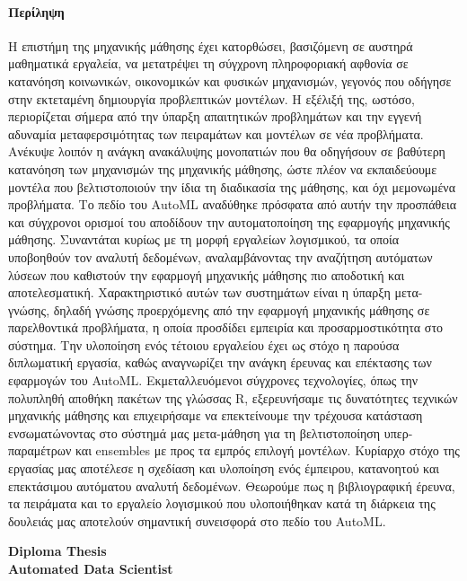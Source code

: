 {
	\titleformat{\paragraph}[display]{\normalfont\Large\bfseries\centering}{\theparagraph}{1em}{}
	\paragraph{Περίληψη}
	Η επιστήμη της μηχανικής μάθησης έχει κατορθώσει, βασιζόμενη σε αυστηρά μαθηματικά εργαλεία, να μετατρέψει τη σύγχρονη πληροφοριακή αφθονία σε κατανόηση κοινωνικών, οικονομικών και φυσικών μηχανισμών, γεγονός που οδήγησε στην εκτεταμένη δημιουργία προβλεπτικών μοντέλων. Η εξέλιξή της, ωστόσο, περιορίζεται σήμερα από την ύπαρξη απαιτητικών προβλημάτων και την εγγενή αδυναμία μεταφερσιμότητας των πειραμάτων και μοντέλων σε νέα προβλήματα. Ανέκυψε λοιπόν η ανάγκη ανακάλυψης μονοπατιών που θα οδηγήσουν σε βαθύτερη κατανόηση των μηχανισμών της μηχανικής μάθησης, ώστε πλέον να εκπαιδεύουμε μοντέλα που βελτιστοποιούν την ίδια τη διαδικασία της μάθησης, και όχι μεμονωμένα προβλήματα. Το πεδίο του ΑutoML αναδύθηκε πρόσφατα από αυτήν την προσπάθεια και σύγχρονοι ορισμοί του αποδίδουν την αυτοματοποίηση της εφαρμογής μηχανικής μάθησης. Συναντάται κυρίως με τη μορφή εργαλείων λογισμικού, τα οποία υποβοηθούν τον αναλυτή δεδομένων, αναλαμβάνοντας την αναζήτηση αυτόματων λύσεων που καθιστούν την εφαρμογή μηχανικής μάθησης πιο αποδοτική και αποτελεσματική. Χαρακτηριστικό αυτών των συστημάτων είναι η ύπαρξη μετα-γνώσης, δηλαδή γνώσης προερχόμενης από την εφαρμογή μηχανικής μάθησης σε παρελθοντικά προβλήματα, η οποία προσδίδει εμπειρία και προσαρμοστικότητα στο σύστημα. Την υλοποίηση ενός τέτοιου εργαλείου έχει ως στόχο η παρούσα διπλωματική εργασία, καθώς αναγνωρίζει την ανάγκη έρευνας και επέκτασης των εφαρμογών του \gls{AutoML}. Εκμεταλλευόμενοι σύγχρονες τεχνολογίες, όπως την πολυπληθή αποθήκη πακέτων της γλώσσας R, εξερευνήσαμε τις δυνατότητες τεχνικών μηχανικής μάθησης και επιχειρήσαμε να επεκτείνουμε την τρέχουσα κατάσταση ενσωματώνοντας στο σύστημά μας μετα-μάθηση για τη βελτιστοποίηση υπερ-παραμέτρων και ensembles με προς τα εμπρός επιλογή μοντέλων. Κυρίαρχο στόχο της εργασίας μας αποτέλεσε η σχεδίαση και υλοποίηση ενός έμπειρου, κατανοητού και επεκτάσιμου αυτόματου αναλυτή δεδομένων. Θεωρούμε πως η βιβλιογραφική έρευνα, τα πειράματα και το εργαλείο λογισμικού που υλοποιήθηκαν κατά τη διάρκεια της δουλειάς μας αποτελούν σημαντική συνεισφορά στο πεδίο του \gls{AutoML}. 
	\newpage
	\begin{center}
		\textbf{\huge{Diploma Thesis\\}}
		\vspace{0.5cm}
		\textbf{\Large{Automated Data Scientist}}
	\end{center}
	
}
